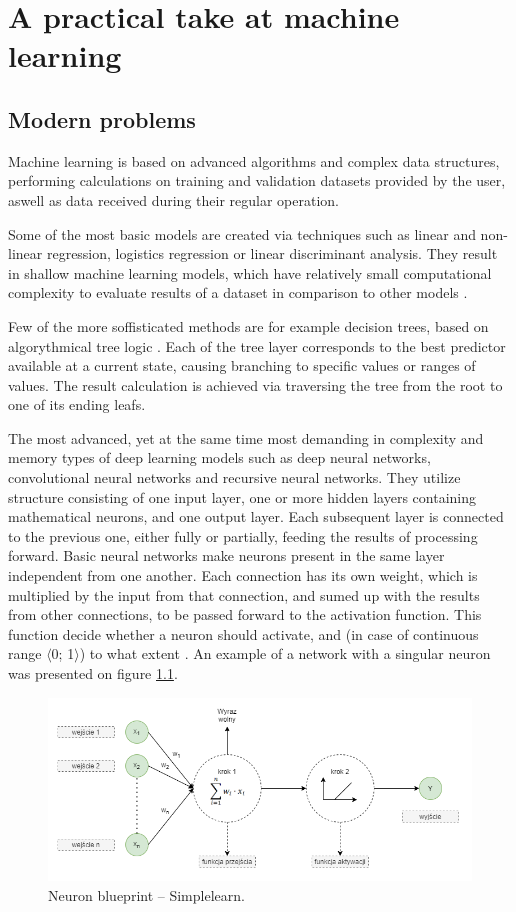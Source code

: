 \chapter{A practical take at machine learning}
\section{Modern problems}

Machine learning is based on advanced algorithms and complex data structures, performing calculations on training and validation datasets provided by the user, aswell as data received during their regular operation.

Some of the most basic models are created via techniques such as linear and non-linear regression, logistics regression or linear discriminant analysis. They result in shallow machine learning models, which have relatively small computational complexity to evaluate results of a dataset in comparison to other models \cite{shallow}.

Few of the more soffisticated methods are for example decision trees, based on algorythmical tree logic \cite{tree}. Each of the tree layer corresponds to the best predictor available at a current state, causing branching to specific values or ranges of values. The result calculation is achieved via traversing the tree from the root to one of its ending leafs. 

The most advanced, yet at the same time most demanding in complexity and memory types of deep learning models such as deep neural networks, convolutional neural networks and recursive neural networks. They utilize structure consisting of one input layer, one or more hidden layers containing mathematical neurons, and one output layer. Each subsequent layer is connected to the previous one, either fully or partially, feeding the results of processing forward. Basic neural networks make neurons present in the same layer independent from one another. Each connection has its own weight, which is multiplied by the input from that connection, and sumed up with the results from other connections, to be passed forward to the activation function. This function decide whether a neuron should activate, and (in case of continuous range $\langle$0; 1$\rangle$) to what extent \cite{mit_neural}. An example of a network with a singular neuron was presented on figure \ref{fig:nn}.

\begin{figure}[!ht]
    \centering
    \includegraphics[width=150mm]{Rysunki/Rozdzial2/neuron.png}
    \caption{Neuron blueprint -- Simplelearn.}
    \label{fig:nn}
\end{figure}

